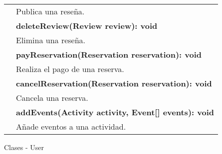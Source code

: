 \begin{clases}
\begin{tabular}{|>{\raggedright\arraybackslash}p{4cm}|p{12cm}|}
		                              & Publica una reseña.                                                                                                                                                                                                                                                    \\
		                              & \textbf{deleteReview(Review review): void}                                                                                                                                                                                                                             \\
		                              & Elimina una reseña.                                                                                                                                                                                                                                                    \\
		                              & \textbf{payReservation(Reservation reservation): void}                                                                                                                                                                                                                 \\
		                              & Realiza el pago de una reserva.                                                                                                                                                                                                                                        \\
		                              & \textbf{cancelReservation(Reservation reservation): void}                                                                                                                                                                                                              \\
		                              & Cancela una reserva.                                                                                                                                                                                                                                                   \\
		                              & \textbf{addEvents(Activity activity, Event[] events): void}                                                                                                                                                                                                            \\
		                              & Añade eventos a una actividad.                                                                                                                                                                                                                                         \\
		\hline
	\end{tabular}
	\caption{Clases - User}
\end{clases}